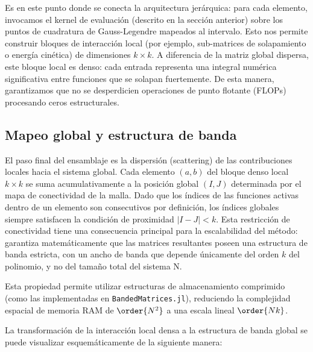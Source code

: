 Es en este punto donde se conecta la arquitectura jerárquica: para cada elemento, invocamos el kernel de evaluación (descrito en la sección anterior) sobre los puntos de cuadratura de Gauss-Legendre mapeados al intervalo. Esto nos permite construir bloques de interacción local (por ejemplo, sub-matrices de solapamiento o energía cinética) de dimensiones \( k \times k \). A diferencia de la matriz global dispersa, este bloque local es denso: cada entrada representa una integral numérica significativa entre funciones que se solapan fuertemente. De esta manera, garantizamos que no se desperdicien operaciones de punto flotante (FLOPs) procesando ceros estructurales.

\subsection{Mapeo global y estructura de banda}

El paso final del ensamblaje es la dispersión (scattering) de las contribuciones locales hacia el sistema global. Cada elemento \( (a,b) \) del bloque denso local \( k\times k \) se suma acumulativamente a la posición global \( (I,J) \) determinada por el mapa de conectividad de la malla.
Dado que los índices de las funciones activas dentro de un elemento son consecutivos por definición, los índices globales siempre satisfacen la condición de proximidad \( |I-J| < k \). Esta restricción de conectividad tiene una consecuencia principal para la escalabilidad del método: garantiza matemáticamente que las matrices resultantes poseen una estructura de banda estricta, con un ancho de banda que depende únicamente del orden \( k \) del polinomio, y no del tamaño total del sistema N.

Esta propiedad permite utilizar estructuras de almacenamiento comprimido (como las implementadas en \texttt{BandedMatrices.jl}), reduciendo la complejidad espacial de memoria RAM de \( \order{N^2} \) a una escala lineal \( \order{Nk} \).

La transformación de la interacción local densa a la estructura de banda global se puede visualizar esquemáticamente de la siguiente manera:

